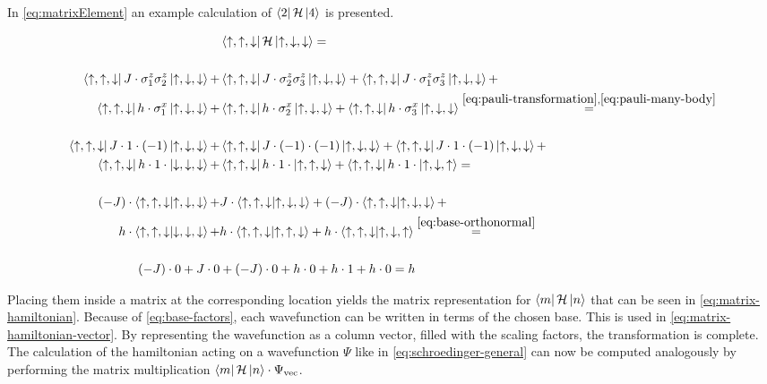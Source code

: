 In \autoref{eq:matrixElement} an example calculation of $\bra{2}\mathcal{H}\ket{4}$ is presented.

\begin{equation}
    \label{eq:matrixElement}
    \begin{split}
        &\bra{\up, \up, \down} \hamiltonian \ket{\up, \down, \down} = \\\\ %
         \bra{\up, \up, \down} J\cdot \sigma^z_1\sigma^z_2 \ket{\up, \down, \down} +
         &\bra{\up, \up, \down} J\cdot \sigma^z_2\sigma^z_3 \ket{\up, \down, \down} +
         \bra{\up, \up, \down} J\cdot \sigma^z_1\sigma^z_3 \ket{\up, \down, \down} +\\
         \bra{\up, \up, \down} h\cdot \sigma^x_1 \ket{\up, \down, \down} +
         &\bra{\up, \up, \down} h\cdot \sigma^x_2 \ket{\up, \down, \down} +
         \bra{\up, \up, \down} h\cdot \sigma^x_3 \ket{\up, \down, \down}\stackrel{\ref{eq:pauli-transformation}, \ref{eq:pauli-many-body}}{=}\\\\ %
          \bra{\up, \up, \down} J\cdot  1 \cdot (-1) \ket{\up, \down, \down} +
         & \bra{\up, \up, \down} J\cdot (-1) \cdot (-1) \ket{\up, \down, \down} +
          \bra{\up, \up, \down} J\cdot  1 \cdot (-1) \ket{\up, \down, \down} +\\
          \bra{\up, \up, \down} h\cdot  1 \cdot \ket{\down, \down, \down} +
         & \bra{\up, \up, \down} h\cdot 1 \cdot \ket{\up, \up, \down} +
          \bra{\up, \up, \down} h\cdot  1 \cdot \ket{\up, \down, \up} =\\\\ %
          (-J)\cdot      \bra{\up, \up, \down}  \ket{\up, \down, \down} +
         & J\cdot        \bra{\up, \up, \down} \ket{\up, \down, \down} +
          (-J)\cdot      \bra{\up, \up, \down}  \ket{\up, \down, \down} +\\
          h\cdot         \bra{\up, \up, \down}  \ket{\down, \down, \down} +
         & h\cdot        \bra{\up, \up, \down} \ket{\up, \up, \down} +
          h\cdot         \bra{\up, \up, \down}  \ket{\up, \down, \up}\stackrel{\ref{eq:base-orthonormal}}{=}\\\\ %
          (-J)\cdot 0 + J\cdot 0 &+  (-J)\cdot 0 + h\cdot 0  + h\cdot 1 + h\cdot 0   = h 
    \end{split}
\end{equation}

Placing them inside a matrix at the corresponding location yields the matrix representation for $\bra{m}\mathcal{H}\ket{n}$ that can be seen in \autoref{eq:matrix-hamiltonian}.
Because of \autoref{eq:base-factors}, each wavefunction can be written in terms of the chosen base. This is used in \autoref{eq:matrix-hamiltonian-vector}. By representing the wavefunction as a column vector, filled with the scaling factors, the transformation is complete. 
The calculation of the hamiltonian \hamiltonian acting on a wavefunction $\Psi$ like in \autoref{eq:schroedinger-general} can now be computed analogously by performing the matrix multiplication $\bra{m}\mathcal{H}\ket{n} \cdot \Psi_\mathrm{vec}$.

